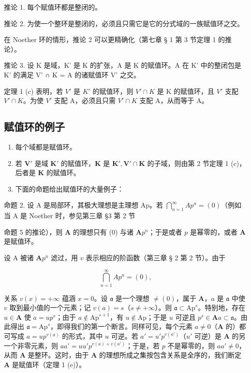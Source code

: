 推论 1. 每个赋值环都是整闭的。

推论 2. 为使一个整环是整闭的，必须且只需它是它的分式域的一族赋值环之交。

在 Noether 环的情形，推论 2 可以更精确化（第七章 § 1 第 3 节定理 1 的推论）。

推论 3. 设 K 是域，K' 是 K 的扩张，A 是 K 的赋值环。A 在 K' 中的整闭包是 K' 的满足 V' ∩ K = A 的诸赋值环 V' 之交。

定理 1 (c) 表明，若 \(V'\) 是 \(K'\) 的赋值环，则 \(V' \cap K\) 是 K 的赋值环，且 \(V'\) 支配 \(V' \cap K\)。为使 \(V'\) 支配 A，必须且只需 \(V' \cap K\) 支配 A，从而等于 A。

\subsection{赋值环的例子}

\begin{enumerate}
\def\labelenumi{(\arabic{enumi})}
\item
  每个域都是赋值环。
\item
  若 \(\mathbf{V}'\) 是域 \(\mathbf{K}'\) 的赋值环，\(\mathbf{K}\) 是 \(\mathbf{K}', \mathbf{V}' \cap \mathbf{K}\) 的子域，则由第 2 节定理 1 (c)，后者是 \(\mathbf{K}\) 的赋值环。
\item
  下面的命题给出赋值环的大量例子：
\end{enumerate}

命题 2. 设 A 是局部环，其极大理想是主理想 Ap。若 \(\bigcap_{n=1}^{\infty} A p^n = (0)\)（例如当 A 是 Noether 时，参见第三章 §3 第 2 节

命题 5 的推论），则 \(\mathbf{A}\) 的理想只有 (0) 与诸 \(\mathbf{A}p^n\)；于是或者 \(p\) 是幂零的，或者 \(\mathbf{A}\) 是赋值环。

设 A 被诸 \(\mathbf{A}p^n\) 滤过，用 \(v\) 表示相应的阶函数（第三章 § 2 第 2 节）。由于

\[
\bigcap_ {n = 1} ^ {\infty} A p ^ {n} = (0),
\]

关系 \(v(x) = +\infty\) 蕴涵 \(x = 0\)。设 \(\mathfrak{a}\) 是一个理想 \(\neq (0)\)，属于 \(\mathbf{A}\)，\(a\) 是 \(\mathfrak{a}\) 中使 \(v\) 取到最小值的一个元素；记 \(v(a) = s\)（\(s \neq +\infty\)）。则 \(\mathfrak{a} \subset \mathrm{Ap}^s\)。特别地，存在 \(u \in \mathbf{A}\) 使 \(a = up^s\)；由于 \(a \notin \mathrm{Ap}^{s+1}\)，有 \(u \notin \mathrm{Ap}\)；于是 \(u\) 可逆且 \(p^s \in \mathbf{A}a \subset \mathfrak{a}\)。由此得出 \(\mathfrak{a} = \mathrm{Ap}^s\)，即得我们的第一个断言。同样可见，每个元素 \(a \neq 0\)（\(\mathbf{A}\) 的）都可写成 \(a = up^{v(a)}\) 的形式，其中 \(u\) 可逆。若 \(a' = u'p^{v(a')}\)（\(u'\) 可逆）是 \(\mathbf{A}\) 的另一个非零元素，则 \(aa' = uu'p^{v(a)+v(a')}\)；于是，若 \(p\) 不是幂零的，则 \(aa' \neq 0\)，从而 \(\mathbf{A}\) 是整环。这时，由于 \(\mathbf{A}\) 的理想所成之集按包含关系是全序的，我们断定 \(\mathbf{A}\) 是赋值环（定理 1 (e)）。

